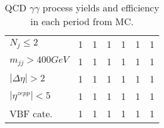 \begin{table}[htbp]
\begin{center}
\begin{tabular}{l|cccccc}
$N_{j}\le2$          & 1                    & 1              & 1                    & 1              & 1                    & 1              \\
$m_{jj}>400GeV$      & 1                    & 1              & 1                    & 1              & 1                    & 1              \\
$|\Delta\eta|>2$     & 1                    & 1              & 1                    & 1              & 1                    & 1              \\
$|\eta^{zepp}|<5$    & 1                    & 1              & 1                    & 1              & 1                    & 1              \\
VBF cate.            & 1                    & 1              & 1                    & 1              & 1                    & 1              \\
\hline
\end{tabular}
\caption{QCD $\gamma\gamma$ process yields and efficiency in each period from MC.}
\label{tab:cutflowyy}
\end{center}
\end{table}


